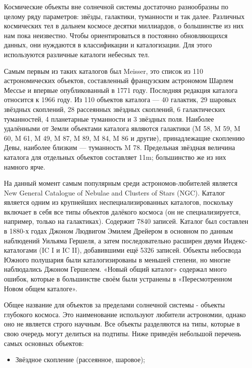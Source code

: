 \documentclass[14pt]{extreport}
\begin{document}
{        Космические объекты вне солнечной системы достаточно разнообразны по целому ряду параметров: звёзды, галактики, туманности и так далее. Различных космических тел в дальнем космосе десятки миллиардов, о большинстве из них нам пока неизвестно. Чтобы ориентироваться в постоянно обновляющихся данных, они нуждаются в классификации и каталогизации. Для этого используются различные каталоги небесных тел. 
        
        Самым первым из таких каталогов был Meisser, это список из 110 астрономических объектов, составленный французским астрономом Шарлем Мессье и впервые опубликованный в 1771 году. Последняя редакция каталога относится к 1966 году. Из 110 объектов каталога — 40 галактик, 29 шаровых звёздных скоплений, 28 рассеянных звёздных скоплений, 6 галактических туманностей, 4 планетарные туманности и 3 звёздных поля. Наиболее удалёнными от Земли объектами каталога являются галактики (M 58, M 59, M 60, M 61, M 49, M 87, M 89, M 84, M 86 и другие), принадлежащие скоплению Девы, наиболее близким — туманность M 78. Предельная звёздная величина каталога для отдельных объектов составляет 11m; большинство же из них намного ярче. 
        
        На данный момент самым популярным среди астрономов-любителей является  New General Catalogue of Nebulae and Clusters of Stars (NGC). Каталог является одним из крупнейших неспециализированных каталогов, поскольку включает в себя все типы объектов далёкого космоса (он не специализируется, например, только на галактиках). Содержит 7840 записей. Каталог был составлен в 1880-х годах Джоном Людвигом Эмилем Дрейером в основном по данным наблюдений Уильяма Гершеля, а затем последовательно расширен двумя Индекс-каталогами (IC I и IC II), добавившими ещё 5326 записей. Объекты небосвода Южного полушария были каталогизированы в меньшей степени, но многие наблюдались Джоном Гершелем. «Новый общий каталог» содержал много ошибок, которые в большинстве своём были устранены в «Пересмотренном Новом общем каталоге».

        Общее название для объектов за пределами солнечной системы - объекты глубокого космоса. Это наименование используют любители астрономии, однако оно не является строго научным. Все объекты разделяются на типы, которые в свою очередь могут делиться на подтипы. Ниже приведён небольшой перечень самых основных объектов:
        
        \begin{itemize}
            \item Звёздное скопление (рассеянное, шаровое);
            

\end{itemize}}
\end{document}
